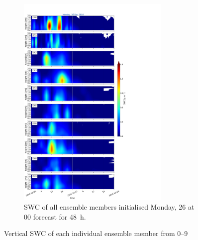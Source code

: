 \begin{figure}[t]\ContinuedFloat
	\centering
	\begin{subfigure}[t]{\textwidth}	
		\centering
		\includegraphics[trim={0cm 0cm 18.3cm 5.1cm},clip,width=0.8\textwidth]{./fig_09EM/20161226}
		\caption{SWC of all ensemble members initialised Monday, \SI{26}{\dec} at 0\SI{0}{\UTC} forecast for \SI{48}{\hour}.}\label{fig:EM09_26}
	\end{subfigure}
	\caption{Vertical SWC of each individual ensemble member from \numrange{0}{9}}\label{fig:EM09}
\end{figure}


